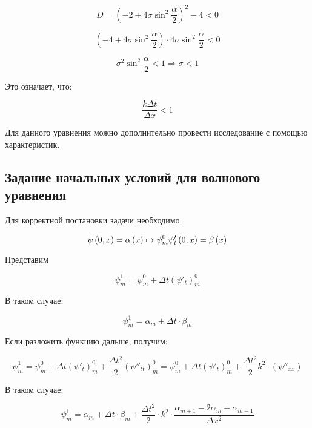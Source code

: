 \documentclass[10pt,a4paper]{article}
\begin{document}
\begin{enumerate}
		\begin{equation}
			D = \left(-2 + 4\sigma\sin^{2}\frac{\alpha}{2}\right)^{2} - 4 < 0
		\end{equation}
		
		\begin{equation}
			\left(-4 + 4\sigma\sin^{2}\frac{\alpha}{2}\right)\cdot
			4\sigma\sin^{2}\frac{\alpha}{2} < 0
		\end{equation}
		
		\begin{equation}
			\sigma^{2}\sin^{2}\frac{\alpha}{2} < 1\Rightarrow \sigma < 1
		\end{equation}
		
		Это означает, что:
		
		\begin{equation}
			\frac{k\Delta t}{\Delta x} < 1
		\end{equation}
		
		Для данного уравнения можно дополнительно провести исследование с 
		помощью характеристик.
	\end{enumerate}
	
	\subsection{Задание начальных условий для волнового уравнения}
	
	Для корректной постановки задачи необходимо:
	
	\begin{equation}
		\psi\left(0, x\right) = \alpha\left(x\right)\mapsto\psi_{m}^{0}
		\\
		\psi'_{t}\left(0, x\right) = \beta\left(x\right)
	\end{equation}
	
	Представим 
	
	\begin{equation}
		\psi^{1}_{m} = \psi_{m}^{0} + \Delta t\left(\psi'_{t}\right)_{m}^{0}
	\end{equation}
	
	В таком случае:
	
	\begin{equation}
		\psi^{1}_{m} = \alpha_{m} + \Delta t\cdot\beta_{m}
	\end{equation}
	
	Если разложить функцию дальше, получим:
	
	\begin{equation}
		\psi^{1}_{m} = \psi_{m}^{0} + \Delta t\left(\psi'_{t}\right)_{m}^{0} + 
		\frac{\Delta t^{2}}{2}\left(\psi''_{tt}\right)_{m}^{0} = 
		\psi_{m}^{0} + \Delta t\left(\psi'_{t}\right)_{m}^{0} + 
		\frac{\Delta t^{2}}{2}k^{2}\cdot\left(\psi''_{xx}\right)
	\end{equation}
	
	В таком случае:
	
	\begin{equation}
		\psi^{1}_{m} = \alpha_{m} + \Delta t\cdot\beta_{m} + \frac{\Delta t^{2}}
		{2}\cdot k^{2}\cdot\frac{\alpha_{m + 1} - 2\alpha_{m} + \alpha_{m - 1}}
		{\Delta x^{2}}
	\end{equation}
	
\end{document}
